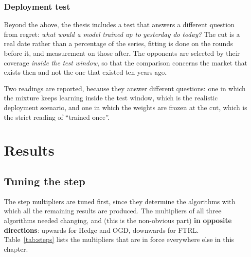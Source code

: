 \documentclass[12pt,a4paper,oneside]{report}
\renewcommand{\_}{\oldunderscore\allowbreak}
\theoremstyle{definition}
\theoremstyle{plain}
\theoremstyle{definition}   %
\begin{document}
\subsection{Deployment test}

Beyond the above, the thesis includes a test that answers a different question from regret:
\emph{what would a model trained up to yesterday do today?} The cut is a real date rather than a
percentage of the series, fitting is done on the rounds before it, and measurement on those
after. The opponents are selected by their coverage \emph{inside the test window}, so that the
comparison concerns the market that exists then and not the one that existed ten years ago.

Two readings are reported, because they answer different questions: one in which the mixture
keeps learning inside the test window, which is the realistic deployment scenario, and one in
which the weights are frozen at the cut, which is the strict reading of ``trained once''.

\chapter{Results}
\label{ch:results}

\section{Tuning the step}
\label{sec:res-steps}

The step multipliers are tuned first, since they determine the algorithms with which all the
remaining results are produced. The multipliers of all three algorithms needed changing, and
(this is the non-obvious part) \textbf{in opposite directions}: upwards for Hedge and OGD,
downwards for FTRL. Table~\ref{tab:steps} lists the multipliers that are in force everywhere else in this chapter.
\end{document}
